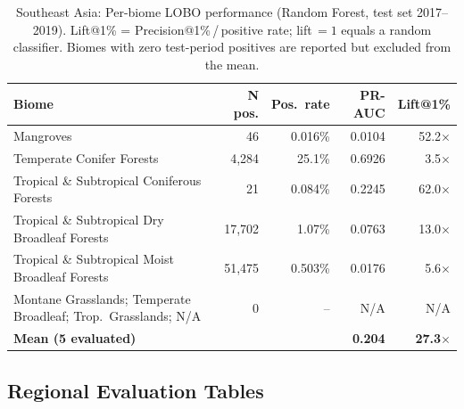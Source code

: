 \documentclass[12pt]{article}
\theoremstyle{break}
\begin{document}
\begin{appendices}
\begin{table}[!htbp]
\centering\small
\caption{Southeast Asia: Per-biome LOBO performance (Random Forest, test set 2017--2019).
Lift@1\% = Precision@1\%\,/\,positive rate; lift\,$=1$ equals a random classifier.
Biomes with zero test-period positives are reported but excluded from the mean.}
\label{tab:lobo_seasia}
\begin{tabular}{p{7cm}rrrr}
\toprule
\textbf{Biome} & \textbf{N pos.} & \textbf{Pos.\ rate} & \textbf{PR-AUC} & \textbf{Lift@1\%} \\
\midrule
Mangroves                                                        &     46   & 0.016\%  & 0.0104 &  52.2$\times$ \\
Temperate Conifer Forests                                        &  4{,}284 & 25.1\%   & 0.6926 &   3.5$\times$ \\
Tropical \& Subtropical Coniferous Forests                       &     21   & 0.084\%  & 0.2245 &  62.0$\times$ \\
Tropical \& Subtropical Dry Broadleaf Forests                    & 17{,}702 & 1.07\%   & 0.0763 &  13.0$\times$ \\
Tropical \& Subtropical Moist Broadleaf Forests                  & 51{,}475 & 0.503\%  & 0.0176 &   5.6$\times$ \\
Montane Grasslands; Temperate Broadleaf; Trop.\ Grasslands; N/A   &      0   & --       & N/A   & N/A           \\
\midrule
\textbf{Mean (5 evaluated)} & & & \textbf{0.204} & \textbf{27.3$\times$} \\
\bottomrule
\end{tabular}
\end{table}

\subsection*{Regional Evaluation Tables}


\end{appendices}
\end{document}
